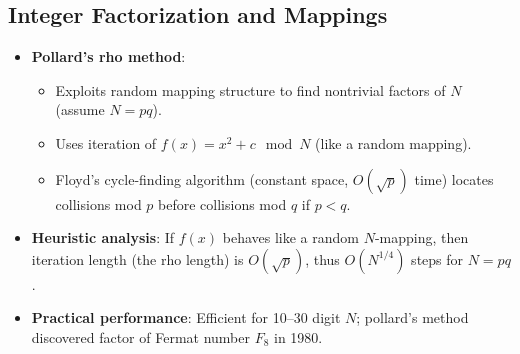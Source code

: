 \documentclass[11pt,letterpaper]{article}
\begin{document}
\subsection{Integer Factorization and Mappings}
\begin{itemize}
  \item \textbf{Pollard's rho method}:
    \begin{itemize}
      \item Exploits random mapping structure to find nontrivial factors of $N$ (assume $N = pq$).
      \item Uses iteration of $f(x) = x^2 + c\mod N$ (like a random mapping).
      \item Floyd's cycle-finding algorithm (constant space, $O(\sqrt{p})$ time) locates collisions mod $p$ before collisions mod $q$ if $p < q$.
    \end{itemize}
  \item \textbf{Heuristic analysis}: If $f(x)$ behaves like a random $N$-mapping, then iteration length (the rho length) is $O(\sqrt{p})$, thus $O(N^{1/4})$ steps for $N = pq$. 
  \item \textbf{Practical performance}: Efficient for 10--30 digit $N$; pollard's method discovered factor of Fermat number $F_8$ in 1980.
\end{itemize}

\end{document}
